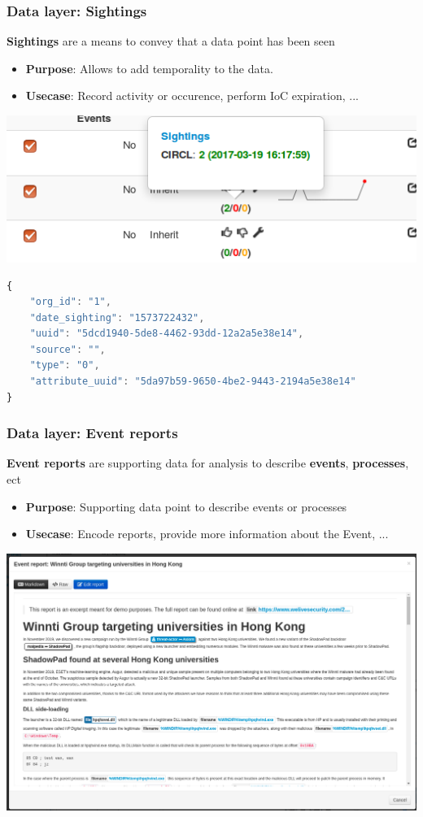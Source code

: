 \begin{frame}[fragile]
    \frametitle{Data layer: Sightings}
    {\bf Sightings} are a means to convey that a data point has been seen
    \begin{itemize}
        \item[] \textbf{Purpose}: Allows to add temporality to the data.
        \item[] \textbf{Usecase}: Record activity or occurence, perform IoC expiration, ...
    \end{itemize}
    \begin{center}
        \includegraphics[width=0.7\linewidth]{screenshots/sighting-n.png}
    \end{center}
    \begin{lstlisting}[language=javascript,firstnumber=1]
{
    "org_id": "1",
    "date_sighting": "1573722432",
    "uuid": "5dcd1940-5de8-4462-93dd-12a2a5e38e14",
    "source": "",
    "type": "0",
    "attribute_uuid": "5da97b59-9650-4be2-9443-2194a5e38e14"
}
\end{lstlisting}
\end{frame}

\begin{frame}[fragile]
    \frametitle{Data layer: Event reports}
    {\bf Event reports} are supporting data for analysis to describe {\bf events}, {\bf processes}, ect
    \begin{itemize}
        \item[] \textbf{Purpose}: Supporting data point to describe events or processes
        \item[] \textbf{Usecase}: Encode reports, provide more information about the Event, ...
    \end{itemize}
    \begin{center}
        \includegraphics[width=0.7\linewidth]{screenshots/event-report.png}
    \end{center}
\end{frame}

